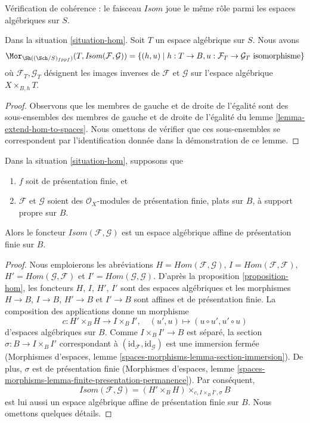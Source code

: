 \noindent
Vérification de cohérence : le faisceau $\mathit{Isom}$ joue le même rôle parmi
les espaces algébriques sur $S$.

\begin{lemma}
\label{lemma-extend-isom-to-spaces}
Dans la situation \ref{situation-hom}. Soit $T$ un espace algébrique sur $S$.
Nous avons
$$
\Mor_{\Sh((\Sch/S)_{fppf})}(T, \mathit{Isom}(\mathcal{F}, \mathcal{G})) =
\{(h, u) \mid
h : T \to B, u : \mathcal{F}_T \to \mathcal{G}_T\text{ isomorphisme}\}
$$
où $\mathcal{F}_T, \mathcal{G}_T$ désignent les images inverses de
$\mathcal{F}$ et $\mathcal{G}$ sur l'espace algébrique
$X \times_{B, h} T$.
\end{lemma}

\begin{proof}
Observons que les membres de gauche et de droite de l'égalité sont des
sous-ensembles des membres de gauche et de droite de l'égalité du lemme
\ref{lemma-extend-hom-to-spaces}. Nous omettons de vérifier que ces
sous-ensembles se correspondent par l'identification donnée dans la
démonstration de ce lemme.
\end{proof}

\begin{proposition}
\label{proposition-isom}
Dans la situation \ref{situation-hom}, supposons que
\begin{enumerate}
\item $f$ soit de présentation finie, et
\item $\mathcal{F}$ et $\mathcal{G}$ soient des $\mathcal{O}_X$-modules de
présentation finie, plats sur $B$, à support propre sur $B$.
\end{enumerate}
Alors le foncteur $\mathit{Isom}(\mathcal{F}, \mathcal{G})$ est un espace
algébrique affine de présentation finie sur $B$.
\end{proposition}

\begin{proof}
Nous emploierons les abréviations
$H = \mathit{Hom}(\mathcal{F}, \mathcal{G})$,
$I = \mathit{Hom}(\mathcal{F}, \mathcal{F})$,
$H' = \mathit{Hom}(\mathcal{G}, \mathcal{F})$ et
$I' = \mathit{Hom}(\mathcal{G}, \mathcal{G})$.
D'après la proposition \ref{proposition-hom}, les foncteurs
$H$, $I$, $H'$, $I'$ sont des espaces algébriques et les morphismes
$H \to B$, $I \to B$, $H' \to B$ et $I' \to B$ sont affines et de
présentation finie. La composition des applications donne un morphisme
$$
c : H' \times_B H \longrightarrow I \times_B I',\quad
(u', u) \longmapsto (u \circ u', u' \circ u)
$$
d'espaces algébriques sur $B$. Comme $I \times_B I' \to B$ est séparé, la
section $\sigma : B \to I \times_B I'$ correspondant à
$(\text{id}_\mathcal{F}, \text{id}_\mathcal{G})$ est une immersion fermée
(Morphismes d'espaces, lemme
\ref{spaces-morphisms-lemma-section-immersion}). De plus, $\sigma$ est de
présentation finie (Morphismes d'espaces, lemme
\ref{spaces-morphisms-lemma-finite-presentation-permanence}). Par conséquent,
$$
\mathit{Isom}(\mathcal{F}, \mathcal{G}) =
(H' \times_B H) \times_{c, I \times_B I', \sigma} B
$$
est lui aussi un espace algébrique affine de présentation finie sur $B$.
Nous omettons quelques détails.
\end{proof}






